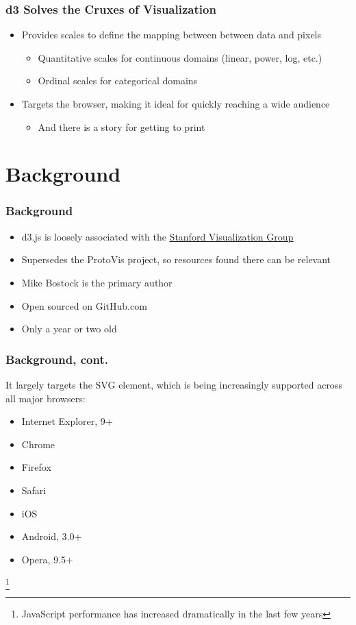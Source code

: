 \documentclass{beamer}
\begin{document}
\begin{frame}
\frametitle{d3 Solves the Cruxes of Visualization}
\begin{itemize}
\pause
\item Provides scales to define the mapping between between data and pixels
\pause
    \begin{itemize}
    \item Quantitative scales for continuous domains (linear, power, log, etc.)
\pause
    \item Ordinal scales for categorical domains
    \end{itemize}
\pause
\item Targets the browser, making it ideal for quickly reaching a wide audience
    \begin{itemize}
\pause
    \item And there is a story for getting to print
    \end{itemize}
\end{itemize}
\end{frame}



\section{Background}



\begin{frame}
\frametitle{Background}
\begin{itemize}
\item d3.js is loosely associated with the \href{http://vis.stanford.edu/}{\underline{Stanford Visualization Group}}
\pause
\item Supersedes the ProtoVis project, so resources found there can be relevant
\pause
\item Mike Bostock is the primary author
\pause
\item Open sourced on GitHub.com
\pause
\item Only a year or two old
\end{itemize}
\end{frame}



\begin{frame}
\frametitle{Background, cont.}
It largely targets the SVG element, which is being increasingly supported across all major browsers:
\pause
    \begin{itemize}
    \item Internet Explorer, 9+
    \item Chrome
    \item Firefox
    \item Safari
    \item iOS
    \item Android, 3.0+
    \item Opera, 9.5+
    \end{itemize}
\pause
\footnote{JavaScript performance has increased dramatically in the last few years}
\end{frame}
\end{document}
